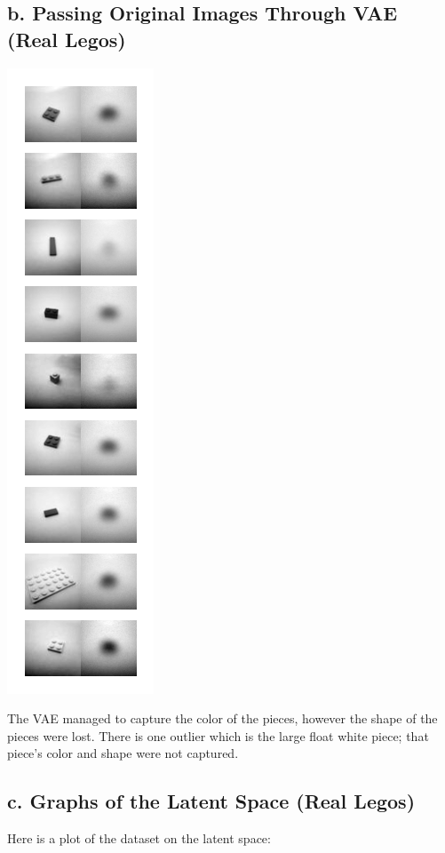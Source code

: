 \documentclass[]{article}
\begin{document}
\subsection*{b. Passing Original Images Through VAE (Real Legos)}
\begin{center}
  \includegraphics[scale=1]{10_original-lego-dataset}
\end{center}

The VAE managed to capture the color of the pieces,
however the shape of the pieces were lost.
There is one outlier which is the large float white piece;
that piece's color and shape were not captured.

\subsection*{c. Graphs of the Latent Space (Real Legos)}

Here is a plot of the dataset on the latent space:
\end{document}
